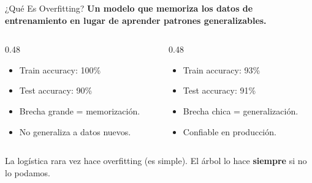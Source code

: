 \documentclass[aspectratio=169, 11pt]{beamer}
\begin{document}
\begin{frame}{¿Qué Es Overfitting?}
  \vspace{-4pt}
  {\footnotesize\color{arcaDark}\bfseries
    Un modelo que \textbf{memoriza} los datos de entrenamiento en lugar
    de \textbf{aprender} patrones generalizables.}

  \vspace{8pt}
  \begin{columns}[T]
    \begin{column}{0.48\textwidth}
      \begin{tcolorbox}[colback=arcaRed!8, colframe=arcaRed, boxrule=0.5pt,
        arc=2pt, left=6pt, right=6pt, top=4pt, bottom=4pt,
        title={\small\color{white}\bfseries\faTimesCircle\ Overfitting}]
        {\scriptsize
        \begin{itemize}\setlength{\itemsep}{2pt}
          \item Train accuracy: 100\%
          \item Test accuracy: 90\%
          \item Brecha grande = memorización.
          \item No generaliza a datos nuevos.
        \end{itemize}
        }
      \end{tcolorbox}
    \end{column}
    \begin{column}{0.48\textwidth}
      \begin{tcolorbox}[colback=codeGreen!8, colframe=codeGreen, boxrule=0.5pt,
        arc=2pt, left=6pt, right=6pt, top=4pt, bottom=4pt,
        title={\small\color{white}\bfseries\faCheckCircle\ Buen ajuste}]
        {\scriptsize
        \begin{itemize}\setlength{\itemsep}{2pt}
          \item Train accuracy: 93\%
          \item Test accuracy: 91\%
          \item Brecha chica = generalización.
          \item Confiable en producción.
        \end{itemize}
        }
      \end{tcolorbox}
    \end{column}
  \end{columns}

  \vspace{6pt}
  {\scriptsize\color{textMuted}
    \faArrowRight\hspace{4pt} La logística rara vez hace overfitting (es simple).
    El árbol lo hace \textbf{siempre} si no lo podamos.}
\end{frame}
\end{document}
